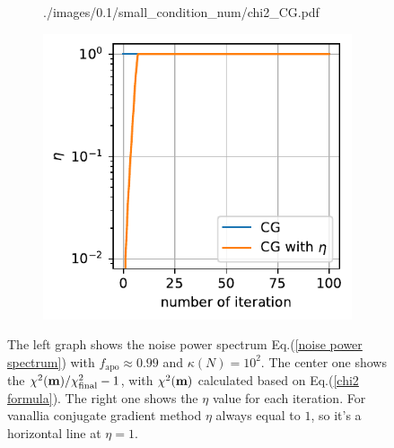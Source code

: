 \documentclass[11pt, letterpaper]{article}
\newcommand{\vbm}{\vb{m}}
\begin{document}
\begin{figure}[htb]
\begin{subfigure}{0.33\textwidth}
        {./images/0.1/small_condition_num/chi2_CG.pdf}
    \caption{}
    \label{small condi num chi2 CG}
\end{subfigure}%
\begin{subfigure}{0.33\textwidth}
    \centering
    \includegraphics[width=\linewidth]
        {./images/0.1/small_condition_num/eta_CG.pdf}
    \caption{}
    \label{small condi num eta CG}
\end{subfigure}
\caption{The left graph shows the noise power spectrum
    Eq.(\ref{noise power spectrum}) with $f_{\text{apo}} \approx 0.99$ and
    $\kappa(N) = 10^2$. The center one shows the
    $\chi^2(\vbm)/\chi^2_{\text{final}} - 1$, with $\chi^2(\vbm)$ calculated
    based on Eq.(\ref{chi2 formula}).
    The right one shows the $\eta$ value for each iteration. For vanallia 
    conjugate gradient method $\eta$ always equal to $1$, so it's a horizontal
    line at $\eta=1$.
}
\label{small condi num CG}
\end{figure}
\end{document}
